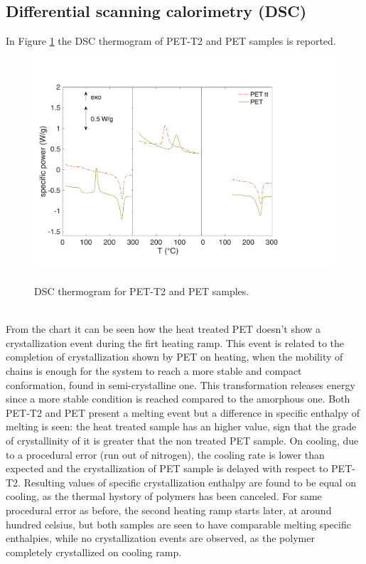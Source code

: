 \documentclass[a4paper, 11pt]{article}
\begin{document}
\newpage

\subsection{Differential scanning calorimetry (DSC)}

In Figure \ref{fig:dscPET} the DSC thermogram of PET-T2 and PET samples is reported. 
\begin{figure}[htp]
\centering
{\includegraphics[scale=0.3]{dscPET}} 
\captionsetup{justification=centering}
\caption{DSC thermogram for PET-T2 and PET samples.}
\label{fig:dscPET}
\end{figure}\\
From the chart it can be seen how the heat treated PET doesn't show a crystallization event during the firt heating ramp. This event is related to the completion of crystallization shown by PET on heating, when the mobility of chains is enough for the system to reach a more stable and compact conformation, found in semi-crystalline one. This transformation releases energy since a more stable condition is reached compared to the amorphous one. Both PET-T2 and PET present a melting event but a difference in specific enthalpy of melting is seen: the heat treated sample has an higher value, sign that the grade of crystallinity of it is greater that the non treated PET sample. On cooling, due to a procedural error (run out of nitrogen), the cooling rate is lower than expected and the crystallization of PET sample is delayed with respect to PET-T2. Resulting values of specific crystallization enthalpy are found to be equal on cooling, as the thermal hystory of polymers has been canceled. For same procedural error as before, the second heating ramp starts later, at around hundred celsius, but both samples are seen to have comparable melting specific enthalpies, while no crystallization events are observed, as the polymer completely crystallized on cooling ramp. \\
\end{document}
